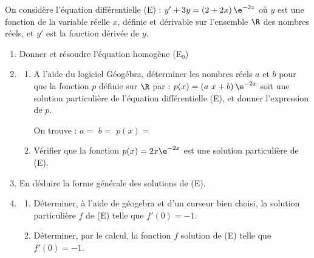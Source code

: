 On considère l’équation différentielle (E) : $y' + 3y = \left(2+2x\right)\e^{-2x}$ où $y$ est une fonction de la variable réelle $x$, définie et dérivable sur l’ensemble $\R$ des nombres réels, et $y'$ est la fonction dérivée de $y$.

\begin{enumerate}
	\item Donner et résoudre l'équation homogène (E$_0$)\sautp

    \item \begin{enumerate}
	\item A l’aide du logiciel Géogébra, déterminer les nombres réels $a$ et $b$ pour que la fonction $p$ définie sur $\R$ par : $p(x) = \left(a~x + b\right)\e^{-2x}$ soit une solution particulière de l'équation différentielle (E), et donner l’expression de $p$. \sautm
		
		
		On trouve : $a=$\makebox[0.1\linewidth]{\dotfill} \hfill $b=$\makebox[0.1\linewidth]{\dotfill} \hfill $p(x)=$\makebox[0.3\linewidth]{\dotfill}\sauts
	\end{enumerate}
	\appelprof
    \begin{enumerate}
    \setcounter{enumii}{1}
	\item Vérifier que la fonction $p(x)=2x \e^{-2x}$ est une solution particulière de (E).\sautm

    \end{enumerate}
	\item En déduire la forme générale des solutions de (E).\sautp

    \item \begin{enumerate}
	\item Déterminer, à l'aide de géogebra et d'un curseur bien choisi, la solution particulière $f$ de (E) telle que $f'(0)=-1$.\sautp

    \end{enumerate}
    \appelprof
    \begin{enumerate}
    \setcounter{enumii}{1}
	\item Déterminer, par le calcul, la fonction $f$ solution de (E) telle que $f'(0)=-1$.\sautp

    \end{enumerate}
\end{enumerate}